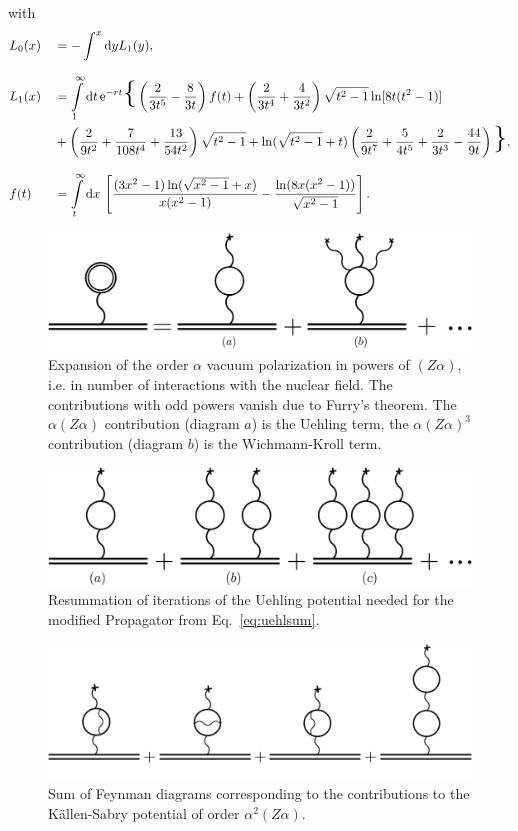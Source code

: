 with
\begin{alignat}{2}
&L_0(x)&&=-\int^x\text{d}yL_1(y),\\[7.5pt]
&L_1(x) &&= \int\limits_1^\infty\text{d}t\,\e^{-rt}\text{\huge\{}
\left(\frac{2}{3t^5}-\frac{8}{3t}\right)f(t)
+\left(\frac{2}{3t^4}+\frac{4}{3t^2}\right)\sqrt{t^2-1}\ln[8t(t^2-1)]\\
&&&+\left(\frac{2}{9t^2}+\frac{7}{108t^4}+\frac{13}{54t^2}\right)\sqrt{t^2-1}
+\ln (\sqrt{t^2-1}+t)\left(\frac{2}{9t^7}+\frac{5}{4t^5}+\frac{2}{3t^3}-\frac{44}{9t}\right)
\text{\huge\}},\\[7.5pt]
&f(t) &&= \int\limits_t^\infty\text{d}x\,
\left[
\frac{(3x^2-1)\ln (\sqrt{x^2-1}+x)}{x(x^2-1)}-
\frac{\ln(8x(x^2-1))}{\sqrt{x^2-1}}
\right].
\end{alignat}
%
\begin{figure}%
\centering
\includegraphics[width=0.75\linewidth]{pics/vac_pol_wk.pdf}%
\caption{Expansion of the order $\alpha$ vacuum polarization in powers of $(Z\alpha)$, i.e. in number of interactions with the nuclear field. The contributions with odd powers vanish due to Furry's theorem. The $\alpha(Z\alpha)$ contribution (diagram $a$) is the Uehling term, the $\alpha(Z\alpha)^3$ contribution (diagram $b$) is the Wichmann-Kroll term.}%
\label{fig:vac_pol_wk}%
\end{figure}
%
%
\begin{figure}%
\centering
\includegraphics[width=0.8\linewidth]{pics/vac_pol_uehl.pdf}%
\caption{Resummation of iterations of the Uehling potential needed for the modified Propagator from Eq.~\eqref{eq:uehlsum}.}%
\label{fig:vac_pol_uehl}%
\end{figure}
%
%
\begin{figure}%
\centering
\includegraphics[width=0.9\linewidth]{pics/vac_pol_ks.pdf}%
\caption{Sum of Feynman diagrams corresponding to the contributions to the Källen-Sabry potential of order $\alpha^2(Z\alpha)$.}%
\label{fig:vac_pol_ks}%
\end{figure}
%
